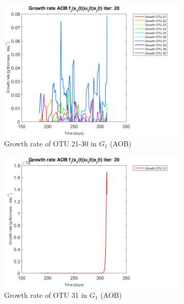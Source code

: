 \documentclass[3p,times]{article}
\begin{document}
\begin{figure}[h]
\begin{subfigure}{0.45 \textwidth}
		\includegraphics[width =\textwidth]{Application//200407_iter_20_growth_control_AOB_plot_3}
		\caption{Growth rate of OTU 21-30 in $G_1$ (AOB) }
	\end{subfigure}
	\begin{subfigure}{0.45 \textwidth}
		\includegraphics[width =\textwidth]{Application//200407_iter_20_growth_control_AOB_plot_4}
		\caption{Growth rate of OTU 31 in $G_1$ (AOB) }
	\end{subfigure}
	\begin{subfigure}{0.45 \textwidth}

\end{subfigure}
\end{figure}
\end{document}
